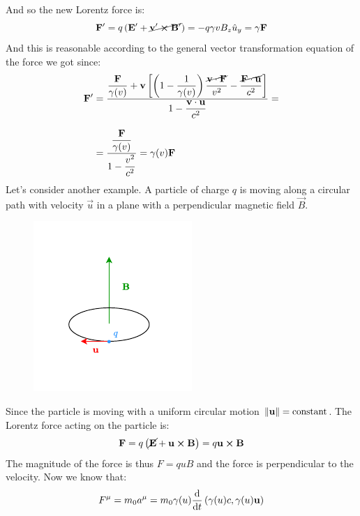 And so the new Lorentz force is:
\begin{equation}
  \vb{F}' = q\left(\vb{E}' + \cancel{\vb{v}'\cross \vb{B}'}\right) = -q\gamma v B_z \hat{u}_y = \gamma \vb{F}
\end{equation}
And this is reasonable according to the general vector transformation equation of the force we got since:
\begin{equation}
  \begin{split}
    \vb{F}' &= \dfrac{\dfrac{\vb{F}}{\gamma (v)} + \vb{v}\left[\left(1- \dfrac{1}{\gamma(v)}\right)\dfrac{\cancel{\vb{v}\cdot \vb{F}}}{v^2}-\dfrac{\cancel{\vb{F}\cdot \vb{u}}}{c^2}\right]}{1-\dfrac{\vb{v}\cdot\vb{u}}{c^2}} = \\[8pt]
    &= \dfrac{\dfrac{\vb{F}}{\gamma(v)}}{1-\dfrac{v^2}{c^2}} = \gamma(v)\vb{F}
  \end{split}
\end{equation}
Let's consider another example. A particle of charge $q$ is moving along a circular path with velocity $\vec{u}$ in a plane with a perpendicular magnetic field $\vec{B}$.
\begin{figure}[H]
  \centering
  \includegraphics[width=0.6\linewidth]{res/svg/ciclotronic_motion.drawio}
\end{figure}
Since the particle is moving with a uniform circular motion $\norm{\vb{u}} = \text{constant}$. The Lorentz force acting on the particle is:
\begin{equation}
  \vb{F} = q\left(\cancel{\vb{E}} + \vb{u} \cross \vb{B}\right) = q\vb{u} \cross \vb{B}
\end{equation}
The magnitude of the force is thus $F = quB$ and the force is perpendicular to the velocity. Now we know that:
\begin{equation}
  F^{\mu} = m_0a^{\mu} = m_0 \gamma(u) \dv{}{t}\brackets{\gamma(u)c, \gamma(u)\vec{u}}
\end{equation}
